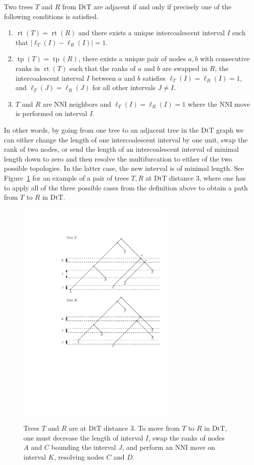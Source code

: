 \documentclass{amsart}
\theoremstyle{definition}
\newcommand{\mdts}{\mathrm{DtT}}
\newcommand{\rt}{\operatorname{rt}}
\newcommand{\tp}{\operatorname{tp}}
\begin{document}
Two trees $T$ and $R$ from $\mdts$ are adjacent if and only if precisely one of the following conditions is satisfied.
\begin{enumerate}[(1)]
\item $\rt(T) = \rt(R)$ and there exists a unique intercoalescent interval $I$ such that $|\ell_T(I) - \ell_R(I)| = 1$.
\item $\tp(T) = \tp(R)$, there exists a unique pair of nodes $a,b$ with consecutive ranks in $\rt(T)$ such that the ranks of $a$ and $b$ are swapped in $R$, the intercoalescent interval $I$ between $a$ and $b$ satisfies $\ell_T(I) = \ell_R(I) = 1$, and $\ell_T(J) = \ell_R(J)$ for all other intervals $J \ne I$.
\item $T$ and $R$ are NNI neighbors and $\ell_T(I) = \ell_R(I) = 1$ where the NNI move is performed on interval $I$.
\end{enumerate}

In other words, by going from one tree to an adjacent tree in the $\mdts$ graph we can either change the length of one intercoalescent interval by one unit, swap the rank of two nodes, or send the length of an intercoalescent interval of minimal length down to zero and then resolve the multifurcation to either of the two possible topologies.
In the latter case, the new interval is of minimal length.
See Figure~\ref{dts_neighbors.pdf} for an example of a pair of trees $T,R$ at $\mdts$ distance $3$, where one has to apply all of the three possible cases from the definition above to obtain a path from $T$ to $R$ in $\mdts$.

\begin{figure}[ht]
\centering
\includegraphics[width=0.7\textwidth]{dts_neighbors.pdf}
\label{dts_neighbors.pdf}
\caption{Trees $T$ and $R$ are at $\mdts$ distance $3$.
To move from $T$ to $R$ in $\mdts$, one must decrease the length of interval $I$, swap the ranks of nodes $A$ and $C$ bounding the interval $J$, and perform an NNI move on interval $K$, resolving nodes $C$ and $D$.}
\end{figure}
\end{document}
